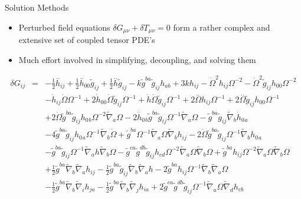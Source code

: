 \documentclass[8pt]{beamer}
\begin{document}
\begin{frame}{Solution Methods}
	\begin{itemize}
		\item Perturbed field equations $\delta G_{\mu\nu} + \delta T_{\mu\nu} = 0$ form a rather complex and extensive set of coupled tensor PDE's
		\item
		Much effort involved in simplifying, decoupling, and solving them
	\end{itemize}
	\begin{eqnarray*}
		\delta G_{ij} &=& - \tfrac{1}{2} \overset{..}{h}_{ij} + \tfrac{1}{2} \overset{..}{h}_{00}{} \tilde{g}_{ij} + \tfrac{1}{2} \overset{..}{h} \tilde{g}_{ij} -  k \tilde{g}^{ba} \tilde{g}_{ij} h_{ab} + 3 k h_{ij} -  \dot{\Omega}^2 h_{ij} \Omega^{-2} -  \dot{\Omega}^2 \tilde{g}_{ij} h_{00}{} \Omega^{-2} 
		\nonumber\\
		&& -  \dot{h}_{ij} \dot{\Omega} \Omega^{-1}  + 2 \dot{h}_{00}{} \dot{\Omega} \tilde{g}_{ij} \Omega^{-1} + \dot{h} \dot{\Omega} \tilde{g}_{ij} \Omega^{-1} + 2 \overset{..}{\Omega} h_{ij} \Omega^{-1} + 2 \overset{..}{\Omega} \tilde{g}_{ij} h_{00}{} \Omega^{-1} 
		\nonumber\\
		&& + 2 \dot{\Omega} \tilde{g}^{ba} \tilde{g}_{ij} h_{0}{}_{b} \Omega^{-2} \tilde{\nabla}_{a}\Omega  - 2 \dot{h}_{0}{}_{b} \tilde{g}^{ba} \tilde{g}_{ij} \Omega^{-1} \tilde{\nabla}_{a}\Omega -  \tilde{g}^{ba} \tilde{g}_{ij} \tilde{\nabla}_{b}\dot{h}_{0}{}_{a} 
		\nonumber\\
		&& - 4 \tilde{g}^{ba} \tilde{g}_{ij} h_{0}{}_{a} \Omega^{-1} \tilde{\nabla}_{b}\dot{\Omega} + \tilde{g}^{ba} \Omega^{-1} \tilde{\nabla}_{a}\Omega \tilde{\nabla}_{b}h_{ij} - 2 \dot{\Omega} \tilde{g}^{ba} \tilde{g}_{ij} \Omega^{-1} \tilde{\nabla}_{b}h_{0}{}_{a}
		\nonumber\\
		&&  -  \tilde{g}^{ba} \tilde{g}_{ij} \Omega^{-1} \tilde{\nabla}_{a}h \tilde{\nabla}_{b}\Omega -  \tilde{g}^{ca} \tilde{g}^{db} \tilde{g}_{ij} h_{cd} \Omega^{-2} \tilde{\nabla}_{a}\Omega \tilde{\nabla}_{b}\Omega  + \tilde{g}^{ba} h_{ij} \Omega^{-2} \tilde{\nabla}_{a}\Omega \tilde{\nabla}_{b}\Omega 
		\nonumber\\
		&&+ \tfrac{1}{2} \tilde{g}^{ba} \tilde{\nabla}_{b}\tilde{\nabla}_{a}h_{ij} -  \tfrac{1}{2} \tilde{g}^{ba} \tilde{g}_{ij} \tilde{\nabla}_{b}\tilde{\nabla}_{a}h - 2 \tilde{g}^{ba} h_{ij} \Omega^{-1} \tilde{\nabla}_{b}\tilde{\nabla}_{a}\Omega  
		\nonumber\\
		&& -  \tfrac{1}{2} \tilde{g}^{ba} \tilde{\nabla}_{b}\tilde{\nabla}_{i}h_{ja} -  \tfrac{1}{2} \tilde{g}^{ba} \tilde{\nabla}_{b}\tilde{\nabla}_{j}h_{ia} + 2 \tilde{g}^{ca} \tilde{g}^{db} \tilde{g}_{ij} \Omega^{-1} \tilde{\nabla}_{a}\Omega \tilde{\nabla}_{d}h_{cb} 

\end{eqnarray*}
\end{frame}
\end{document}
